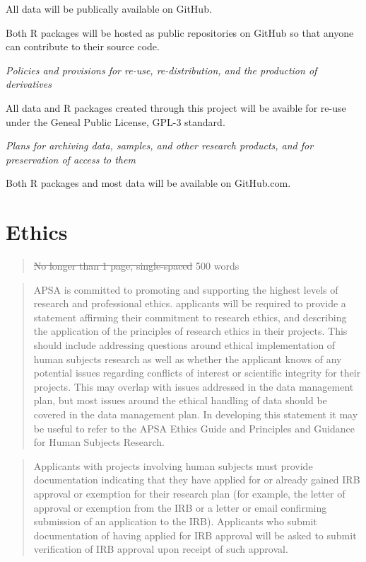 \documentclass[
      12pt,
        ]{article}
\begin{document}
All data will be publically available on GitHub.

Both R packages will be hosted as public repositories on GitHub so that anyone can contribute to their source code.

\emph{Policies and provisions for re-use, re-distribution, and the production of derivatives}

All data and R packages created through this project will be avaible for re-use under the Geneal Public License, GPL-3 standard.

\emph{Plans for archiving data, samples, and other research products, and for preservation of access to them}

Both R packages and most data will be available on GitHub.com.

\newpage

\hypertarget{ethics}{%
\section{Ethics}\label{ethics}}

\begin{quote}
\sout{No longer than 1 page, single-spaced} 500 words
\end{quote}

\begin{quote}
APSA is committed to promoting and supporting the highest levels of research and professional ethics. applicants will be required to provide a statement affirming their commitment to research ethics, and describing the application of the principles of research ethics in their projects. This should include addressing questions around ethical implementation of human subjects research as well as whether the applicant knows of any potential issues regarding conflicts of interest or scientific integrity for their projects. This may overlap with issues addressed in the data management plan, but most issues around the ethical handling of data should be covered in the data management plan. In developing this statement it may be useful to refer to the APSA Ethics Guide and Principles and Guidance for Human Subjects Research.
\end{quote}

\begin{quote}
Applicants with projects involving human subjects must provide documentation indicating that they have applied for or already gained IRB approval or exemption for their research plan (for example, the letter of approval or exemption from the IRB or a letter or email confirming submission of an application to the IRB). Applicants who submit documentation of having applied for IRB approval will be asked to submit verification of IRB approval upon receipt of such approval.
\end{quote}
\end{document}
